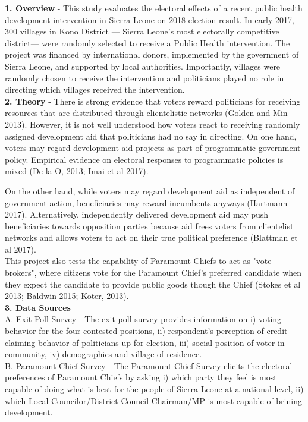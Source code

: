 \documentclass[11pt]{article}
\begin{document}
\maketitle
\textbf{1. Overview} - 
This study evaluates the electoral effects of a recent public health development intervention in Sierra Leone on 2018 election result. In early 2017, 300 villages in Kono District --- Sierra Leone's most electorally competitive district--- were randomly selected to receive a Public Health intervention. The project was financed by international donors, implemented by the government of Sierra Leone, and supported by local authorities. Importantly, villages were randomly chosen to receive the intervention and politicians played no role in directing which villages received the intervention.\\

\textbf{2. Theory} - 
There is strong evidence that voters reward politicians for receiving resources that are distributed through clientelistic networks (Golden and Min 2013). However, it is not well understood how voters react to receiving randomly assigned development aid that politicians had no say in directing. On one hand, voters may regard development aid projects as part of programmatic government policy. Empirical evidence on electoral responses to programmatic policies is mixed (De la O, 2013; Imai et al 2017).  

On the other hand, while voters may regard development aid as independent of government action, beneficiaries may reward incumbents anyways (Hartmann 2017). Alternatively, independently delivered development aid may push beneficiaries towards opposition parties because aid frees voters from clientelist networks and allows voters to act on their true political preference (Blattman et al 2017).\\
This project also tests the capability of Paramount Chiefs to act as "vote brokers", where citizens vote for the Paramount Chief's preferred candidate when they expect the candidate to provide public goods though the Chief (Stokes et al 2013; Baldwin 2015; Koter, 2013).    \\

\textbf{3. Data Sources} \\ 
\underline{A. Exit Poll Survey} - The exit poll survey provides information on i) voting behavior for the four contested positions, ii) respondent’s perception of credit claiming behavior of politicians up for election, iii) social position of voter in community, iv) demographics and village of residence.\\
\underline{B. Paramount Chief Survey} - The Paramount Chief Survey elicits the electoral preferences of Paramount Chiefs by asking i) which party they feel is most capable of doing what is best for the people of Sierra Leone at a national level, ii) which Local Councilor/District Council Chairman/MP is most capable of brining development. \\
\end{document}
